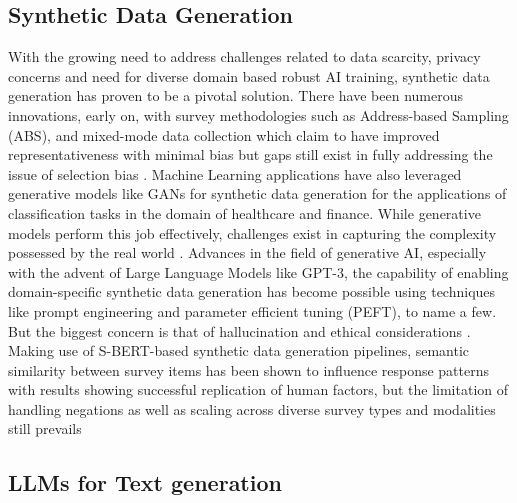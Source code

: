 \documentclass[11pt]{article}
\begin{document}
\subsection{Synthetic Data Generation}

With the growing need to address challenges related to data scarcity, privacy concerns and need for diverse domain based robust AI training, synthetic data generation has proven to be a pivotal solution. There have been numerous innovations, early on, with survey methodologies such as Address-based Sampling (ABS), and mixed-mode data collection which claim to have improved representativeness with minimal bias but gaps still exist in fully addressing the issue of selection bias \citep{annurev:/content/journals/10.1146/annurev-soc-060116-053613}.  Machine Learning applications have also leveraged generative models like GANs for synthetic data generation for the applications of classification tasks in the domain of healthcare and finance. While generative models perform this job effectively, challenges exist in capturing the complexity possessed by the real world \citep{9677302}. Advances in the field of generative AI, especially with the advent of Large Language Models like GPT-3, the capability of enabling domain-specific synthetic data generation has become possible using techniques like prompt engineering and parameter efficient tuning (PEFT), to name a few. But the biggest concern is that of hallucination and ethical considerations \citep{guo2024generativeaisyntheticdata}. Making use of S-BERT-based synthetic data generation pipelines, semantic similarity between survey items has been shown to influence response patterns with results showing successful replication of human factors, but the limitation of handling negations as well as scaling across diverse survey types and modalities still prevails \citep{10906589}

\subsection{LLMs for Text generation}
\end{document}
